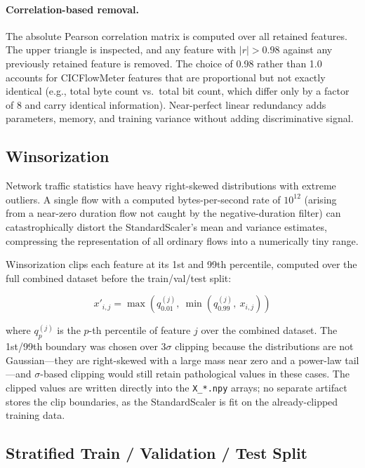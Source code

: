 \documentclass[12pt]{article}
\theoremstyle{plain}
\begin{document}
\paragraph{Correlation-based removal.}
The absolute Pearson correlation matrix is computed over all retained features. The upper triangle is inspected, and any feature with $|r| > 0.98$ against any previously retained feature is removed. The choice of 0.98 rather than 1.0 accounts for CICFlowMeter features that are proportional but not exactly identical (e.g., total byte count vs.\ total bit count, which differ only by a factor of 8 and carry identical information). Near-perfect linear redundancy adds parameters, memory, and training variance without adding discriminative signal.

\subsection{Winsorization}

Network traffic statistics have heavy right-skewed distributions with extreme outliers. A single flow with a computed bytes-per-second rate of $10^{12}$ (arising from a near-zero duration flow not caught by the negative-duration filter) can catastrophically distort the StandardScaler's mean and variance estimates, compressing the representation of all ordinary flows into a numerically tiny range.

Winsorization clips each feature at its 1st and 99th percentile, computed over the full combined dataset before the train/val/test split:

\begin{equation}
x'_{i,j} = \max\!\left(q_{0.01}^{(j)},\ \min\!\left(q_{0.99}^{(j)},\ x_{i,j}\right)\right)
\end{equation}

where $q_{p}^{(j)}$ is the $p$-th percentile of feature $j$ over the combined dataset. The 1st/99th boundary was chosen over 3$\sigma$ clipping because the distributions are not Gaussian—they are right-skewed with a large mass near zero and a power-law tail—and $\sigma$-based clipping would still retain pathological values in these cases. The clipped values are written directly into the \texttt{X\_*.npy} arrays; no separate artifact stores the clip boundaries, as the StandardScaler is fit on the already-clipped training data.

\subsection{Stratified Train / Validation / Test Split}
\end{document}
